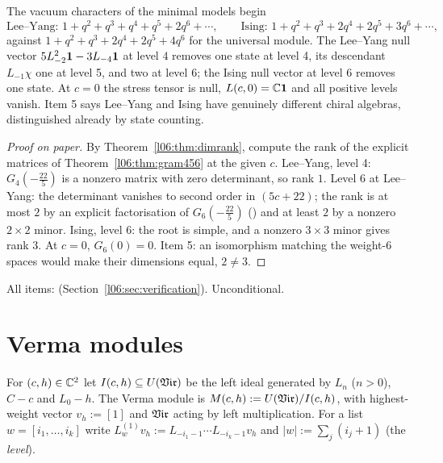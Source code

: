 \begin{physics}
The vacuum characters of the minimal models begin
\begin{equation*}
 \text{Lee--Yang: }1+q^2+q^3+q^4+q^5+2q^6+\cdots,\qquad
 \text{Ising: }1+q^2+q^3+2q^4+2q^5+3q^6+\cdots,
\end{equation*}
against $1+q^2+q^3+2q^4+2q^5+4q^6$ for the universal module. The Lee--Yang null vector
$5L_{-2}^2\mathbf{1}-3L_{-4}\mathbf{1}$ at level $4$ removes one state at level 4, its descendant $L_{-1}\chi$
one at level 5, and two at level 6; the Ising null vector at level 6 removes one state. At $c = 0$ the
stress tensor is null, $L(c,0) = {\mathbb{C}}\mathbf{1}$ and all positive levels vanish. Item 5 says Lee--Yang and Ising
have genuinely different chiral algebras, distinguished already by state counting.
\end{physics}

\begin{proof}[Proof on paper]
By Theorem~\ref{l06:thm:dimrank}, compute the rank of the explicit matrices of
Theorem~\ref{l06:thm:gram456} at the given $c$. Lee--Yang, level 4: $G_4(-\frac{22}5)$ is a nonzero matrix
with zero determinant, so rank $1$. Level 6 at Lee--Yang: the determinant vanishes to second order in
$(5c+22)$; the rank is at most $2$ by an explicit factorisation of $G_6(-\frac{22}5)$
() and at least $2$ by a nonzero $2\times2$ minor. Ising, level 6: the root is simple, and a nonzero $3\times3$ minor gives rank $3$.
At $c = 0$, $G_6(0) = 0$. Item 5: an isomorphism matching the weight-6 spaces would make their dimensions
equal, $2\ne3$.
\end{proof}

\begin{status}
All items: \lean{[propext, Classical.}\allowbreak{}\allowbreak\lean{sound]} (Section~\ref{l06:sec:verification}).
Unconditional.
\end{status}

\section{Verma modules}\label{l06:sec:verma}

\begin{definition}\label{l06:def:verma}
For $(c,h)\in{\mathbb{C}}^2$ let $I(c,h)\subseteq U(\mathfrak{Vir})$ be the left ideal generated by $L_n$ ($n>0$), $C-c$ and
$L_0-h$. The Verma module is $M(c,h) := U(\mathfrak{Vir})/I(c,h)$, with highest-weight vector $v_h := [1]$ and
$\mathfrak{Vir}$ acting by left multiplication. For a list $w = [i_1,\dots,i_k]$ write
$L^{(1)}_wv_h := L_{-i_1-1}\cdots L_{-i_k-1}v_h$ and $|w| := \sum_j(i_j+1)$ (the \emph{level}).
\end{definition}

